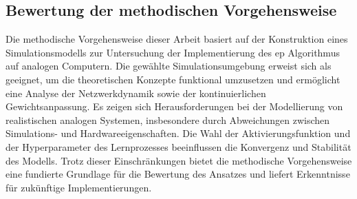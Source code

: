 \subsection{Bewertung der methodischen Vorgehensweise}

Die methodische Vorgehensweise dieser Arbeit basiert auf der Konstruktion eines Simulationsmodells zur Untersuchung der Implementierung des \ac{ep} Algorithmus auf analogen Computern. Die gewählte Simulationsumgebung erweist sich als geeignet, um die theoretischen Konzepte funktional umzusetzen und ermöglicht eine Analyse der Netzwerkdynamik sowie der kontinuierlichen Gewichtsanpassung. Es zeigen sich Herausforderungen bei der Modellierung von realistischen analogen Systemen, insbesondere durch Abweichungen zwischen Simulations- und Hardwareeigenschaften. Die Wahl der Aktivierungsfunktion und der Hyperparameter des Lernprozesses beeinflussen die Konvergenz und Stabilität des Modells. Trotz dieser Einschränkungen bietet die methodische Vorgehensweise eine fundierte Grundlage für die Bewertung des Ansatzes und liefert Erkenntnisse für zukünftige Implementierungen.
